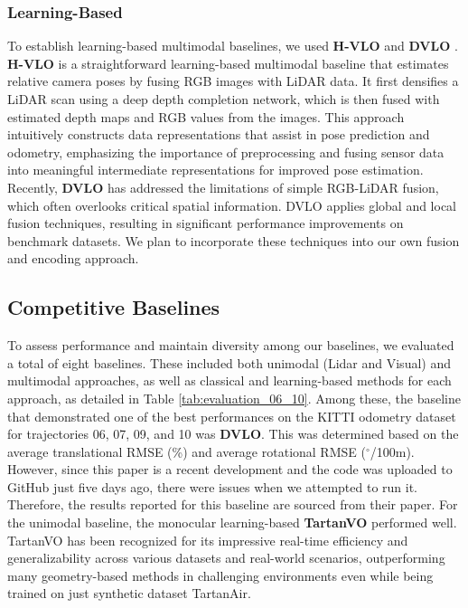 \documentclass[11pt,a4paper]{article}
\begin{document}
\subsubsection{Learning-Based}
To establish learning-based multimodal baselines, we used \textbf{H-VLO} \cite{hvlo} and \textbf{DVLO} \cite{dvlo}.\\
\textbf{H-VLO} is a straightforward learning-based multimodal baseline that estimates relative camera poses by fusing RGB images with LiDAR data. It first densifies a LiDAR scan using a deep depth completion network, which is then fused with estimated depth maps and RGB values from the images. This approach intuitively constructs data representations that assist in pose prediction and odometry, emphasizing the importance of preprocessing and fusing sensor data into meaningful intermediate representations for improved pose estimation. \\
Recently, \textbf{DVLO} has addressed the limitations of simple RGB-LiDAR fusion, which often overlooks critical spatial information. DVLO applies global and local fusion techniques, resulting in significant performance improvements on benchmark datasets. We plan to incorporate these techniques into our own fusion and encoding approach.

\subsection{Competitive Baselines}
To assess performance and maintain diversity among our baselines, we evaluated a total of eight baselines. These included both unimodal (Lidar and Visual) and multimodal approaches, as well as classical and learning-based methods for each approach, as detailed in Table \ref{tab:evaluation_06_10}. Among these, the baseline that demonstrated one of the best performances on the KITTI odometry dataset for trajectories 06, 07, 09, and 10 was \textbf{DVLO}. This was determined based on the average translational RMSE (\%) and average rotational RMSE ($^{\circ}$/100m). However, since this paper is a recent development and the code was uploaded to GitHub just five days ago, there were issues when we attempted to run it. Therefore, the results reported for this baseline are sourced from their paper. 
For the unimodal baseline, the monocular learning-based \textbf{TartanVO} performed well. TartanVO has been recognized for its impressive real-time efficiency and generalizability across various datasets and real-world scenarios, outperforming many geometry-based methods in challenging environments even while being trained on just synthetic dataset TartanAir.
\end{document}
